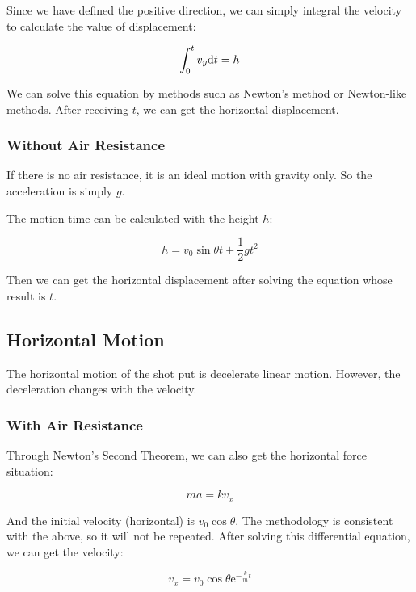 \documentclass{article}
\begin{document}
Since we have defined the positive direction, we can simply integral the velocity to calculate the value of displacement:

\begin{equation}
    \int^t_0v_y\mathrm{d} t=h
\end{equation}

We can solve this equation by methods such as Newton's method or Newton-like methods. After receiving $t$, we can get the horizontal displacement.

\subsubsection{Without Air Resistance}

If there is no air resistance, it is an ideal motion with gravity only. So the acceleration is simply $g$.

The motion time can be calculated with the height $h$:

\begin{equation}
    h = v_0\sin\theta t + \dfrac{1}{2}gt^2
\end{equation}

Then we can get the horizontal displacement after solving the equation whose result is $t$.

\subsection{Horizontal Motion}

The horizontal motion of the shot put is decelerate linear motion. However, the deceleration changes with the velocity.

\subsubsection{With Air Resistance}

Through Newton's Second Theorem, we can also get the horizontal force situation:

\begin{equation*}
    ma = kv_x
\end{equation*}

And the initial velocity (horizontal) is $v_0\cos\theta$. The methodology is consistent with the above, so it will not be repeated. After solving this differential equation, we can get the velocity:

\begin{equation}
    v_x=v_0\cos\theta\mathrm{e}^{-\frac{k}{m}t}
\end{equation}
\end{document}
